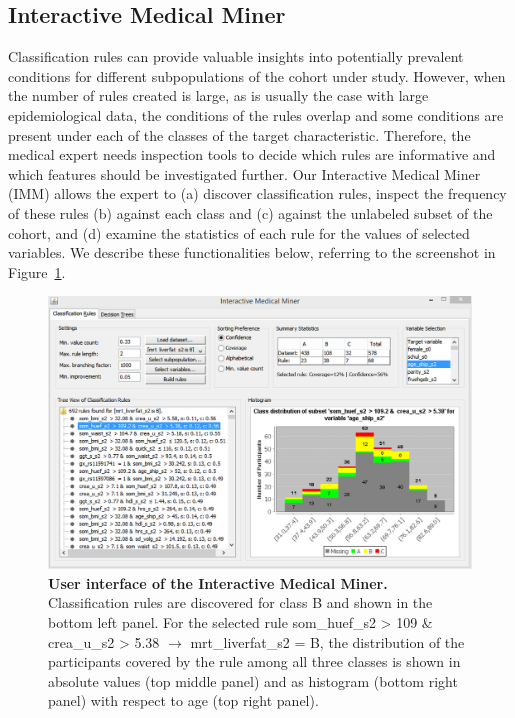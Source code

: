\documentclass[
  oneside]{book}
\begin{document}
\hypertarget{imm-workflow-imm}{%
\subsection{Interactive Medical Miner}\label{imm-workflow-imm}}

Classification rules can provide valuable insights into potentially prevalent conditions for different subpopulations of the cohort under study.
However, when the number of rules created is large, as is usually the case with large epidemiological data, the conditions of the rules overlap and some conditions are present under each of the classes of the target characteristic.
Therefore, the medical expert needs inspection tools to decide which rules are informative and which features should be investigated further.
Our Interactive Medical Miner (IMM) allows the expert to (a) discover classification rules, inspect the frequency of these rules (b) against each class and (c) against the unlabeled subset of the cohort, and (d) examine the statistics of each rule for the values of selected variables.
We describe these functionalities below, referring to the screenshot in Figure~\ref{fig:03-imm-modified}.



\begin{figure}[htbp]

{\centering \includegraphics[width=1\linewidth]{figures/03-imm-modified} 

}

\caption{\textbf{User interface of the Interactive Medical Miner.} Classification rules are discovered for class B and shown in the bottom left panel. For the selected rule som\_huef\_s2 \textgreater{} 109 \& crea\_u\_s2 \textgreater{} 5.38 \(\longrightarrow\) mrt\_liverfat\_s2 = B, the distribution of the participants covered by the rule among all three classes is shown in absolute values (top middle panel) and as histogram (bottom right panel) with respect to age (top right panel).}\label{fig:03-imm-modified}
\end{figure}
\end{document}
